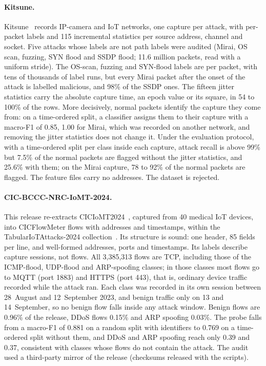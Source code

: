 \paragraph{Kitsune.}
Kitsune~\cite{mirsky2018kitsune} records IP-camera and IoT networks, one capture per attack,
with per-packet labels and 115 incremental statistics per source address, channel and
socket. Five attacks whose labels are not path labels were audited (Mirai, OS scan,
fuzzing, SYN flood and SSDP flood; 11.6 million packets, read with a uniform stride). The
OS-scan, fuzzing and SYN-flood labels are per packet, with tens of thousands of label runs,
but every Mirai packet after the onset of the attack is labelled malicious, and 98\% of the
SSDP ones. The fifteen jitter statistics carry the absolute capture time, an epoch value or
its square, in 54 to 100\% of the rows. More decisively, normal packets identify the
capture they come from: on a time-ordered split, a classifier assigns them to their capture
with a macro-F1 of 0.85, 1.00 for Mirai, which was recorded on another network, and
removing the jitter statistics does not change it. Under the evaluation protocol, with a
time-ordered split per class inside each capture, attack recall is above 99\% but 7.5\%
of the normal packets are flagged without the jitter statistics, and 25.6\% with them;
on the Mirai capture, 78 to 92\% of the normal packets are flagged. The feature files carry
no addresses. The dataset is rejected.

\paragraph{CIC-BCCC-NRC-IoMT-2024.}
This release re-extracts CICIoMT2024~\cite{dadkhah2024ciciomt}, captured from 40 medical
IoT devices, into CICFlowMeter flows with addresses and timestamps, within the
TabularIoTAttacks-2024 collection~\cite{sasi2024tabular}. Its structure is sound: one
header, 85 fields per line, and well-formed addresses, ports and timestamps. Its labels
describe capture sessions, not flows. All 3{,}385{,}313 flows are TCP, including those of
the ICMP-flood, UDP-flood and ARP-spoofing classes; in those classes most flows go to
MQTT (port 1883) and HTTPS (port 443), that is, ordinary device traffic recorded while
the attack ran. Each class was recorded in its own session between 28~August and
12~September 2023, and benign traffic only on 13 and 14~September, so no benign flow
falls inside any attack window. Benign flows are 0.96\% of the release, DDoS flows
0.15\% and ARP spoofing 0.03\%. The probe falls from a macro-F1 of 0.881 on a random
split with identifiers to 0.769 on a time-ordered split without them, and DDoS and ARP
spoofing reach only 0.39 and 0.37, consistent with classes whose flows do not contain
the attack. The audit used a third-party mirror of the release (checksums released with the
scripts).

